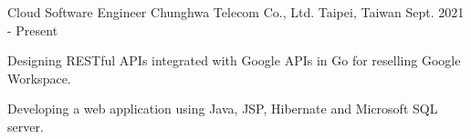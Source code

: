 

\begin{cventries}

  \cventry
    {Cloud Software Engineer} %
    {Chunghwa Telecom Co., Ltd.} %
    {Taipei, Taiwan} %
    {Sept. 2021 - Present} %
    {
      \begin{cvitems} %
        \item {Designing RESTful APIs integrated with Google APIs in Go for reselling Google Workspace.}
        \item {Developing a web application using Java, JSP, Hibernate and Microsoft SQL server.}
      \end{cvitems}
    }


\end{cventries}
